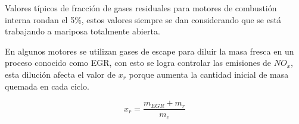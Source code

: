 Valores típicos de fracción de gases residuales para motores de combustión
interna rondan el 5\%, estos valores siempre se dan considerando que se está
trabajando a mariposa totalmente abierta.

En algunos motores se utilizan gases de escape para diluir la masa fresca en un
proceso conocido como EGR, con esto se logra controlar las emisiones de $NO_x$,
esta dilución afecta el valor de $x_r$ porque aumenta la cantidad inicial de
masa quemada en cada ciclo.

\begin{equation}\label{eq:fracRes}
    x_r = \frac{m_{EGR} + m_r}{m_c}
\end{equation}

%

%
